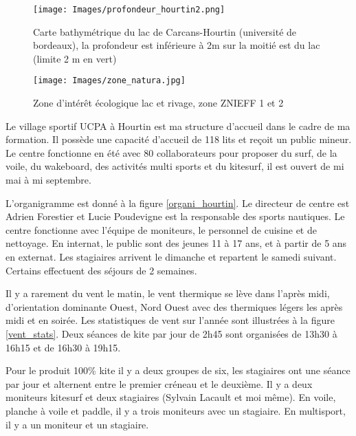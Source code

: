 \documentclass[11pt,a4paper]{report}
\begin{document}
\begin{figure}
\begin{minipage}{0.4\textwidth}
\texttt{[image: Images/profondeur\_hourtin2.png]} 
\caption{Carte bathymétrique du lac de Carcans-Hourtin (université de bordeaux\cite{bathy}), la profondeur est inférieure
à 2m sur la moitié est du lac (limite 2 m en vert)\label{carte_profondeur}}
\end{minipage}
\hfill
\begin{minipage}{0.4\textwidth}
\texttt{[image: Images/zone\_natura.jpg]} 
\caption{Zone d'intér\^et écologique lac et rivage, zone ZNIEFF 1 et 2\label{lac_znieff}}
 \end{minipage}
\end{figure}

Le village sportif UCPA à Hourtin est ma structure d'accueil dans le cadre de
ma formation. Il possède une capacité d'accueil de 118 lits et reçoit un 
public mineur. Le centre fonctionne en été avec 80 collaborateurs pour
proposer du surf, de la voile, du wakeboard, des activités multi sports
et du kitesurf, il est ouvert de mi mai à mi septembre.
 


L'organigramme est donné à la figure \ref{organi_hourtin}.
Le directeur de centre est Adrien Forestier et 
Lucie Poudevigne est la responsable des sports nautiques.
Le centre fonctionne avec l'équipe de moniteurs, le personnel 
de cuisine et de nettoyage. En internat, le public sont des jeunes
11 à 17 ans, et  à partir de 5 ans  en externat.
Les stagiaires arrivent le dimanche et repartent
le samedi suivant. Certains effectuent des séjours de 2 semaines.

Il y a rarement du vent le matin, le vent thermique se lève dans
l'après midi, d'orientation dominante Ouest, Nord Ouest avec des
thermiques légers les après midi et  en soirée. Les statistiques
de vent sur l'année sont illustrées à la figure \ref{vent_stats}.
Deux séances de kite par jour de 2h45 sont organisées de
13h30 à 16h15 et de 16h30 à 19h15. 

Pour le produit 100\% kite il y a deux groupes de six, les stagiaires ont
une séance par jour et alternent entre le premier créneau et le deuxième.
Il y a deux moniteurs kitesurf et deux stagiaires (Sylvain Lacault et moi m\^eme).
En voile, planche à voile et paddle, il y a trois moniteurs avec un stagiaire.
En multisport, il y a un moniteur et un stagiaire.
\end{document}
